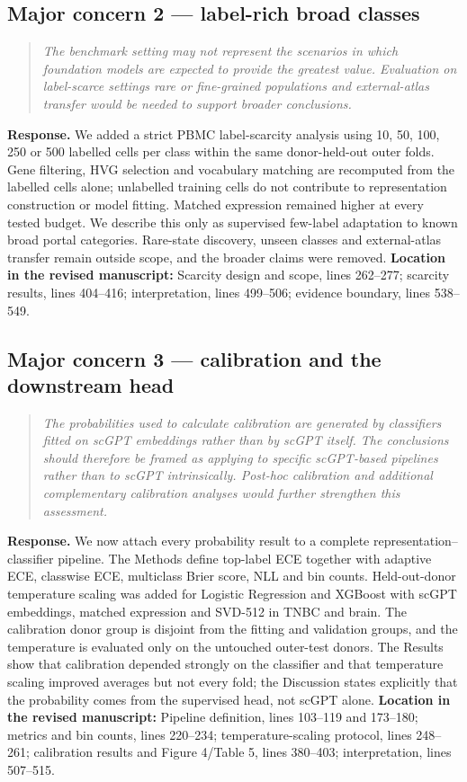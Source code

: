 \documentclass[10pt,a4paper]{article}
\newcommand{\commenttext}[1]{\begin{quote}\colorbox{gray!15}{\parbox{0.91\linewidth}{\itshape #1}}\end{quote}}
\begin{document}
\subsection*{Major concern 2 --- label-rich broad classes}

\commenttext{The benchmark setting may not represent the scenarios in which foundation models are expected to provide the greatest value. Evaluation on label-scarce settings rare or fine-grained populations and external-atlas transfer would be needed to support broader conclusions.}

\textcolor{responseblue}{\textbf{Response.}} We added a strict PBMC label-scarcity analysis using 10, 50, 100, 250 or 500 labelled cells per class within the same donor-held-out outer folds. Gene filtering, HVG selection and vocabulary matching are recomputed from the labelled cells alone; unlabelled training cells do not contribute to representation construction or model fitting. Matched expression remained higher at every tested budget. We describe this only as supervised few-label adaptation to known broad portal categories. Rare-state discovery, unseen classes and external-atlas transfer remain outside scope, and the broader claims were removed. \textbf{Location in the revised manuscript:} Scarcity design and scope, lines 262--277; scarcity results, lines 404--416; interpretation, lines 499--506; evidence boundary, lines 538--549.


\subsection*{Major concern 3 --- calibration and the downstream head}

\commenttext{The probabilities used to calculate calibration are generated by classifiers fitted on scGPT embeddings rather than by scGPT itself. The conclusions should therefore be framed as applying to specific scGPT-based pipelines rather than to scGPT intrinsically. Post-hoc calibration and additional complementary calibration analyses would further strengthen this assessment.}

\textcolor{responseblue}{\textbf{Response.}} We now attach every probability result to a complete representation--classifier pipeline. The Methods define top-label ECE together with adaptive ECE, classwise ECE, multiclass Brier score, NLL and bin counts. Held-out-donor temperature scaling was added for Logistic Regression and XGBoost with scGPT embeddings, matched expression and SVD-512 in TNBC and brain. The calibration donor group is disjoint from the fitting and validation groups, and the temperature is evaluated only on the untouched outer-test donors. The Results show that calibration depended strongly on the classifier and that temperature scaling improved averages but not every fold; the Discussion states explicitly that the probability comes from the supervised head, not scGPT alone. \textbf{Location in the revised manuscript:} Pipeline definition, lines 103--119 and 173--180; metrics and bin counts, lines 220--234; temperature-scaling protocol, lines 248--261; calibration results and Figure 4/Table 5, lines 380--403; interpretation, lines 507--515.
\end{document}
